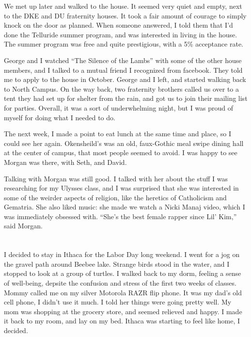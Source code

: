 We met up later and walked to the house.  It seemed very quiet and empty, next
to the DKE and DU fraternity houses.  It took a fair amount of courage to simply
knock on the door as planned.  When someone answered, I told them that I'd done
the Telluride summer program, and was interested in living in the house.  The
summer program was free and quite prestigious, with a 5\% acceptance rate.

George and I watched ``The Silence of the Lambs'' with some of the other house
members, and I talked to a mutual friend I recognized from facebook.  They told
me to apply to the house in October.  George and I left, and started walking
back to North Campus.  On the way back, two fraternity brothers called us over
to a tent they had set up for shelter from the rain, and got us to join their
mailing list for parties.  Overall, it was a sort of underwhelming night, but I
was proud of myself for doing what I needed to do.


The next week, I made a point to eat lunch at the same time and place, so I
could see her again.  Okensheild's was an old, faux-Gothic meal swipe dining
hall at the center of campus, that most people seemed to avoid.   I was happy to
see Morgan was there, with Seth, and David.

Talking with Morgan was still good.  I talked with her about the stuff I was
researching for my Ulysses class, and I was surprised that she was interested in
some of the weirder aspects of religion, like the heretics of Catholicism and
Gematria.  She also liked music: she made we watch a Nicki Manaj video, which I
was immediately obsessed with.  ``She's the best female rapper since Lil' Kim,''
said Morgan.

\section{}

I decided to stay in Ithaca for the Labor Day long weekend.  I went for a jog on
the gravel path around Beebee lake.  Strange birds stood in the water, and I
stopped to look at a group of turtles.  I walked back to my dorm, feeling a
sense of well-being, depsite the confusion and stress of the first two weeks of
classes.  Mommy called me on my silver Motorola RAZR flip phone.  It was my
dad's old cell phone, I didn't use it much.  I told her things were going pretty
well.  My mom was shopping at the grocery store, and seemed relieved and happy.
I made it back to my room, and lay on my bed.  Ithaca was starting to feel like
home, I decided.  

